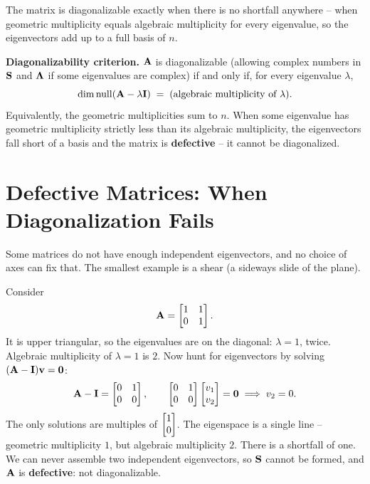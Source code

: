 The matrix is diagonalizable exactly when there is no shortfall anywhere -- when
geometric multiplicity equals algebraic multiplicity for every eigenvalue, so the
eigenvectors add up to a full basis of $n$.

\begin{formalbox}
\textbf{Diagonalizability criterion.} $\mathbf{A}$ is diagonalizable (allowing
complex numbers in $\mathbf{S}$ and $\mathbf{\Lambda}$ if some eigenvalues are
complex) if and only if, for every eigenvalue $\lambda$,
\[
  \dim\operatorname{null}(\mathbf{A}-\lambda\mathbf{I}) \;=\; \text{(algebraic multiplicity of }\lambda).
\]
Equivalently, the geometric multiplicities sum to $n$. When some eigenvalue has
geometric multiplicity strictly less than its algebraic multiplicity, the
eigenvectors fall short of a basis and the matrix is \textbf{defective} -- it
cannot be diagonalized.
\end{formalbox}

\section{Defective Matrices: When Diagonalization Fails}
\label{ch24:defective}

Some matrices do not have enough independent eigenvectors, and no choice of
axes can fix that. The smallest example is a shear (a sideways slide of the
plane).

\begin{example}
\label{ch24:shear}
Consider
\[
  \mathbf{A} = \begin{bmatrix} 1 & 1 \\ 0 & 1 \end{bmatrix}.
\]
It is upper triangular, so the eigenvalues are on the diagonal: $\lambda = 1$,
twice. Algebraic multiplicity of $\lambda=1$ is $2$. Now hunt for eigenvectors by
solving $(\mathbf{A}-\mathbf{I})\mathbf{v} = \mathbf{0}$:
\[
  \mathbf{A} - \mathbf{I} = \begin{bmatrix} 0 & 1 \\ 0 & 0 \end{bmatrix},
  \qquad
  \begin{bmatrix} 0 & 1 \\ 0 & 0 \end{bmatrix}\begin{bmatrix}v_1\\v_2\end{bmatrix} = \mathbf{0}
  \;\Longrightarrow\; v_2 = 0.
\]
The only solutions are multiples of $\begin{bmatrix}1\\0\end{bmatrix}$. The eigenspace is a single
line -- geometric multiplicity $1$, but algebraic multiplicity $2$. There is a
shortfall of one. We can never assemble two independent eigenvectors, so
$\mathbf{S}$ cannot be formed, and $\mathbf{A}$ is \textbf{defective}: not
diagonalizable.
\end{example}

